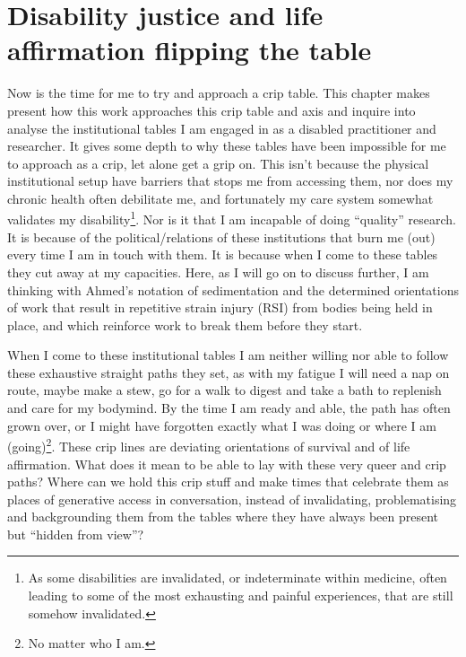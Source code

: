 \hypertarget{disability-justice-and-life-affirmation-flipping-the-table}{%
\section{Disability justice and life affirmation flipping the
table}\label{disability-justice-and-life-affirmation-flipping-the-table}}

Now is the time for me to try and approach a crip table. This chapter
makes present how this work approaches this crip table and axis and
inquire into analyse the institutional tables I am engaged in as a
disabled practitioner and researcher. It gives some depth to why these
tables have been impossible for me to approach as a crip, let alone get
a grip on. This isn't because the physical institutional setup have
barriers that stops me from accessing them, nor does my chronic health
often debilitate me, and fortunately my care system somewhat validates
my disability\footnote{As some disabilities are invalidated, or
  indeterminate within medicine, often leading to some of the most
  exhausting and painful experiences, that are still somehow
  invalidated.}. Nor is it that I am incapable of doing ``quality''
research. It is because of the political/relations of these institutions
that burn me (out) every time I am in touch with them. It is because
when I come to these tables they cut away at my capacities. Here, as I
will go on to discuss further, I am thinking with Ahmed's notation of
sedimentation and the determined orientations of work that result in
repetitive strain injury (RSI) from bodies being held in place, and
which reinforce work to break them before they start.

When I come to these institutional tables I am neither willing nor able
to follow these exhaustive straight paths they set, as with my fatigue I
will need a nap on route, maybe make a stew, go for a walk to digest and
take a bath to replenish and care for my bodymind. By the time I am
ready and able, the path has often grown over, or I might have forgotten
exactly what I was doing or where I am (going)\footnote{No matter who I
  am.}. These crip lines are deviating orientations of survival and of
life affirmation. What does it mean to be able to lay with these very
queer and crip paths? Where can we hold this crip stuff and make times
that celebrate them as places of generative access in conversation,
instead of invalidating, problematising and backgrounding them from the
tables where they have always been present but ``hidden from view''?

